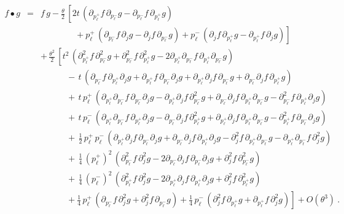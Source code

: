 \documentclass[11pt,a4paper]{article}
\def\d{\partial}
\begin{document}
\begin{eqnarray}
  \label{eq:symtime:positionspace}\nonumber
  f\bullet g&=&f\,g-\frac\theta2\,\left[
  2t\,\left(\d_{p_\ell^+}f\,\d_{p_\ell^-}g
  - \d_{p_\ell^-}f\,\d_{p_\ell^+}g\right)\right.\\\nonumber
  &&\qquad\qquad+\left.p_\ell^+\,\left(\d_{p_\ell^-}f\,\d_j g
  - \d_j f\,\d_{p_\ell^-}g\right)+ p_\ell^-\,\left(\d_j f\,\d_{p_\ell^+}g
   - \d_{p_\ell^+}f\,\d_j g\right)\right]\\ \nonumber
  &&+\,\frac{\theta^2}{2}\,
  \left[t^2\,\left(\d_{p_\ell^+}^2f\,\d_{p_\ell^-}^2g
  +\d_{p_\ell^-}^2f\,\d_{p_\ell^+}^2g
  -2\d_{p_\ell^+}\d_{p_\ell^-}f\,\d_{p_\ell^+}\d_{p_\ell^-}g
  \right)\right.\\ \nonumber &&\qquad\quad
  -\,t\,\left(\d_{p_\ell^-}f\,\d_{p_\ell^+}\d_j g
  +\d_{p_\ell^+}f\,\d_{p_\ell^-}\d_j g
  +\d_{p_\ell^+}\d_j f\,\d_{p_\ell^-}g
  +\d_{p_\ell^-}\d_j f\,\d_{p_\ell^+}g\right)\\ \nonumber
  &&\qquad\quad
  +\,t\,p_\ell^+\,\left(\d_{p_\ell^+}\d_{p_\ell^-}f\,\d_{p_\ell^-}\d_j g
  -\d_{p_\ell^+}\d_j f\,\d_{p_\ell^-}^2g
  +\d_{p_\ell^-}\d_j f\,\d_{p_\ell^+}\d_{p_\ell^-}g
  -\d_{p_\ell^-}^2f\,\d_{p_\ell^+}\d_j g\right)
  \\ \nonumber &&\qquad\quad
  +\,t\,p_\ell^-\,\left(\d_{p_\ell^+}\d_{p_\ell^-}f\,\d_{p_\ell^+}\d_j g
  -\d_{p_\ell^-}\d_j f\,\d_{p_\ell^+}^2g
  +\d_{p_\ell^+}\d_j f\,\d_{p_\ell^+}\d_{p_\ell^-}g
  -\d_{p_\ell^+}^2f\,\d_{p_\ell^-}\d_j g\right)\\ \nonumber
  &&\qquad\quad
  +\,\mbox{$\frac12$}\,p_\ell^+\,p_\ell^-\,\left(
  \d_{p_\ell^+}\d_j f\,\d_{p_\ell^-}\d_j g
  +\d_{p_\ell^-}\d_j f\,\d_{p_\ell^+}\d_j g
  -\d_j ^2f\,\d_{p_\ell^+}\d_{p_\ell^-}g
  -\d_{p_\ell^+}\d_{p_\ell^-}f\,\d_j^2g\right)
  \\ \nonumber &&\qquad\quad
  +\,\mbox{$\frac14$}\,\left(p_\ell^+\right)^2\,
  \left(\d_{p_\ell^-}^2f\,\d_j^2g
  -2\d_{p_\ell^-}\d_j f\,\d_{p_\ell^-}\d_j g
  +\d_j^2f\,\d_{p_\ell^-}^2g\right)\\ \nonumber &&\qquad\quad
  +\,\mbox{$\frac14$}\,\left(p_\ell^-\right)^2\,
  \left(\d_{p_\ell^+}^2f\,\d_j^2g
  -2\d_{p_\ell^+}\d_j f\,\d_{p_\ell^+}\d_j g
  +\d_j^2f\,\d_{p_\ell^+}^2g\right)
  \\ \nonumber &&\qquad\quad
  +\left.\mbox{$\frac14$}\,p_\ell^+\,\left(\d_{p_\ell^-}f\,\d_j^2g
  +\d_j^2f\,\d_{p_\ell^-}g\right)
  +\mbox{$\frac14$}\,p_\ell^-\,\left(\d_j^2f\,\d_{p_\ell^+}g
  +\d_{p_\ell^+}f\,\d_j^2g\right)
  \right]+O\left(\theta^3\right) \ . \\&&
\end{eqnarray}
\end{document}
